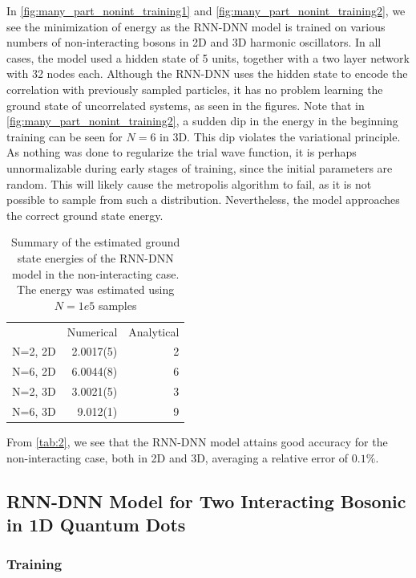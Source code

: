 In \autoref{fig:many_part_nonint_training1} and \autoref{fig:many_part_nonint_training2}, we see the minimization of energy as the RNN-DNN model is trained on various numbers of non-interacting bosons in 2D and 3D harmonic oscillators. In all cases, the model used a hidden state of 5 units, together with a two layer network with 32 nodes each. Although the RNN-DNN uses the hidden state to encode the correlation with previously sampled particles, it has no problem learning the ground state of uncorrelated systems, as seen in the figures. Note that in  \autoref{fig:many_part_nonint_training2}, a sudden dip in the energy in the beginning training can be seen for $N=6$ in 3D. This dip violates the variational principle. As nothing was done to regularize the trial wave function, it is perhaps unnormalizable during early stages of training, since the initial parameters are random. This will likely cause the metropolis algorithm to fail, as it is not possible to sample from such a distribution. Nevertheless, the model approaches the correct ground state energy.

\begin{table}[ht]
	\begin{tabular}{r|rr}
		\toprule
		& Numerical& Analytical     \\
		N=2, 2D    & 2.0017(5) &  2 \\
		N=6, 2D    & 6.0044(8) &  6 \\
		N=2, 3D    & 3.0021(5) &  3 \\
		N=6, 3D    & 9.012(1)  &  9 \\
		\bottomrule
	\end{tabular}
	\caption{Summary of the estimated ground state energies of the RNN-DNN model in the non-interacting case. The energy was estimated using $N=1e5$ samples}
	\label{tab:2}
\end{table}

From \autoref{tab:2}, we see that the RNN-DNN model attains good accuracy for the non-interacting case, both in 2D and 3D, averaging a relative error of $0.1\%$.

\subsection{RNN-DNN Model for Two Interacting Bosonic in 1D Quantum Dots}
\subsubsection{Training}


